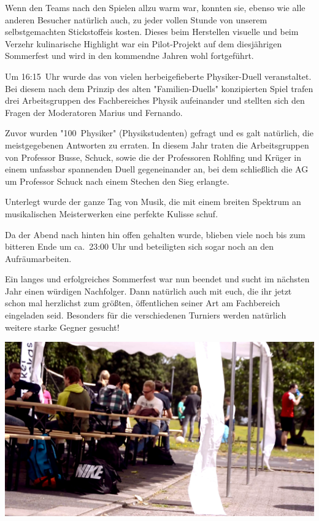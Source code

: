 \begin{multicols*}{2}
Wenn den Teams nach den Spielen allzu warm war, konnten sie, ebenso wie alle anderen Besucher natürlich auch, zu jeder vollen Stunde von unserem selbstgemachten Stickstoffeis kosten. Dieses beim Herstellen visuelle und beim Verzehr kulinarische Highlight war ein Pilot-Projekt auf dem diesjährigen Sommerfest und wird in den kommendne Jahren wohl fortgeführt. 

Um 16:15~Uhr wurde das von vielen herbeigefieberte Physiker-Duell veranstaltet.
Bei diesem nach dem Prinzip des alten "Familien-Duells" konzipierten Spiel trafen drei Arbeitsgruppen des Fachbereiches Physik aufeinander und stellten sich den Fragen der Moderatoren Marius und Fernando.

Zuvor wurden "100~Physiker" (Physikstudenten) gefragt und es galt natürlich, die meistgegebenen Antworten zu erraten.
In diesem Jahr traten die Arbeitsgruppen von Professor Busse, Schuck, sowie die der Professoren Rohlfing und Krüger in einem unfassbar spannenden Duell gegeneinander an, bei dem schließlich die AG um Professor Schuck nach einem Stechen den Sieg erlangte.

Unterlegt wurde der ganze Tag von Musik, die mit einem breiten Spektrum an musikalischen Meisterwerken eine perfekte Kulisse schuf.

Da der Abend nach hinten hin offen gehalten wurde, blieben viele noch bis zum bitteren Ende um ca.~23:00 Uhr und beteiligten sich sogar noch an den Aufräumarbeiten.

Ein langes und erfolgreiches Sommerfest war nun beendet und sucht im nächsten Jahr einen würdigen Nachfolger.
Dann natürlich auch mit euch, die ihr jetzt schon mal herzlichst zum größten, öffentlichen seiner Art am Fachbereich eingeladen seid.
Besonders für die verschiedenen Turniers werden natürlich weitere starke Gegner gesucht!


\medskip
\includegraphics[width=\columnwidth]{res/sommerfest_zelt.png}
\end{multicols*}
